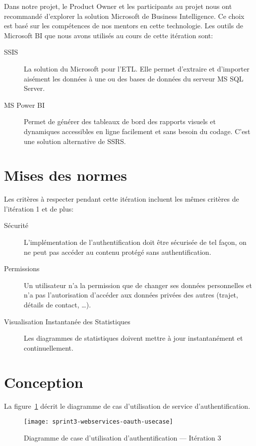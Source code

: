 Dans notre projet, le Product Owner et les participants au projet nous ont
recommandé d'explorer la solution Microsoft de Business Intelligence. Ce
choix est basé sur les compétences de nos mentors en cette technologie. Les
outils de Microsoft BI que nous avons utilisés au cours de cette itération sont:

\begin{description}
    \item [\acrfull{SSIS}] La solution du Microsoft pour l'\acrshort{ETL}. Elle
        permet d'extraire et d'importer aisément les données à une ou des bases
        de données du serveur MS SQL Server.
    \item [MS Power BI] Permet de générer des tableaux de bord des rapports
        visuels et dynamiques accessibles en ligne facilement et sans besoin du
        codage. C'est une solution alternative de \acrfull{SSRS}.
\end{description}

\section{Mises des normes}

Les critères à respecter pendant cette itération incluent les mêmes critères de
l'itération 1 et de plus:

\begin{description}
    \item [Sécurité] L'implémentation de l'authentification doit être sécurisée
        de tel façon, on ne peut pas accéder au contenu protégé sans
        authentification.
    \item [Permissions] Un utilisateur n'a la permission que de changer ses
        données personnelles et n'a pas l'autorisation d'accéder aux données
        privées des autres (trajet, détails de contact, \ldots).
    \item [Visualisation Instantanée des Statistiques] Les diagrammes de
        statistiques doivent mettre à jour instantanément et continuellement.
\end{description}

\section{Conception}

La figure~\ref{fig:sprint3-webservices-oauth-usecase} décrit le diagramme de
cas d'utilisation de service d'authentification.

\begin{figure}[H]
    \centering
    \texttt{[image: sprint3-webservices-oauth-usecase]}
    \caption{Diagramme de case d'utilisation d'authentification --- Itération 3}
\label{fig:sprint3-webservices-oauth-usecase}
\end{figure}

